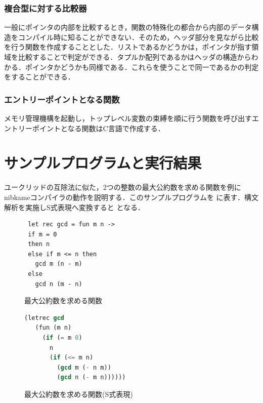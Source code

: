 \documentclass[a4paper,titlepage,disablejfam]{jsbook}
\begin{document}
\subsection{複合型に対する比較器}
一般にポインタの内部を比較するとき，関数の特殊化の都合から内部のデータ構
造をコンパイル時に知ることができない．そのため，ヘッダ部分を見ながら比較
を行う関数を作成することとした．リストであるかどうかは，ポインタが指す領
域を比較することで判定ができる．タプルか配列であるかはヘッダの構造からわ
かる．ポインタかどうかも同様である．これらを使うことで同一であるかの判定
をすることができる．

\subsection{エントリーポイントとなる関数}
メモリ管理機構を起動し，トップレベル変数の束縛を順に行う関数を呼び出すエ
ントリーポイントとなる関数はC言語で作成する．


\chapter{サンプルプログラムと実行結果}\label{ch:sample-program}
ユークリッドの互除法に似た，2つの整数の最大公約数を求める関数を例に
nibkameコンパイラの動作を説明する．このサンプルプログラムを
に表す．構文解析を実施しS式表現へ変換すると
となる．
\begin{figure}[htb]
\begin{minipage}{0.5\hsize}
 \begin{center} 
 \begin{lstlisting}
 let rec gcd = fun m n ->
 if m = 0
 then n
 else if m <= n then
   gcd m (n - m)
 else
   gcd n (m - n)   
 \end{lstlisting}
 \caption{最大公約数を求める関数}\label{fig:impl-sample}
 \end{center}
\end{minipage}
\begin{minipage}{0.5\hsize} 
 \begin{center} 
 \begin{lstlisting}[language=lisp]
 (letrec gcd
   (fun (m n)
     (if (= m 0)
       n
       (if (<= m n)
         (gcd m (- n m))
         (gcd n (- m n))))))  
 \end{lstlisting}
 \caption{最大公約数を求める関数(S式表現)}\label{fig:impl-s-sample}
 \end{center}
\end{minipage}
\end{figure}
\end{document}
